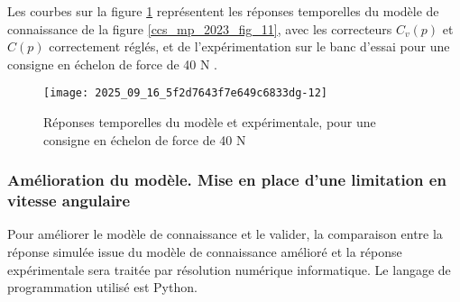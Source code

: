 Les courbes sur la figure \ref{ccs_mp_2023_fig_17} représentent les réponses temporelles du modèle de connaissance de la figure \ref{ccs_mp_2023_fig_11}, avec les correcteurs $C_{v}(p)$ et $C(p)$ correctement réglés, et de l'expérimentation sur le banc d'essai pour une consigne en échelon de force de 40 N .
\ifprof
\begin{corrige}
\end{corrige}
\else
\fi




\begin{figure}[!h]
\centering
\texttt{[image: 2025\_09\_16\_5f2d7643f7e649c6833dg-12]}
\caption{\label{ccs_mp_2023_fig_17} Réponses temporelles du modèle et expérimentale, pour une consigne en échelon de force de 40 N}
\end{figure}




\ifprof
\begin{corrige}
\end{corrige}
\else
\fi



\subsubsection{ Amélioration du modèle. Mise en place d'une limitation en vitesse angulaire}%
Pour améliorer le modèle de connaissance et le valider, la comparaison entre la réponse simulée issue du modèle de connaissance amélioré et la réponse expérimentale sera traitée par résolution numérique informatique. Le langage de programmation utilisé est Python.


